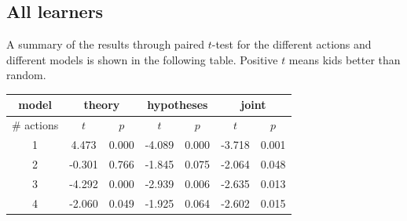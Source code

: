 \documentclass[11pt, a4paper]{article}
\begin{document}
\clearpage
\subsection*{All learners}
A summary of the results through paired $t$-test for the different actions and different models is shown in the following table. Positive $t$ means kids better than random. 
\begin{center}
\begin{tabular}{|c||c|c||c|c||c|c|}
\hline
model & \multicolumn{2}{|c||}{theory} & \multicolumn{2}{|c||}{hypotheses} & \multicolumn{2}{|c|}{joint} \\
\hline
\# actions & $t$ & $p$ & $t$ & $p$ & $t$ & $p$\\
\hline
1 & 4.473 & 0.000 & -4.089 & 0.000 & -3.718 & 0.001\\
2 & -0.301 & 0.766 & -1.845 & 0.075 & -2.064 & 0.048\\
3 & -4.292 & 0.000 & -2.939 & 0.006 & -2.635 & 0.013\\
4 & -2.060 & 0.049 & -1.925 & 0.064 & -2.602 & 0.015\\
\hline
\end{tabular}
\end{center}
\end{document}
